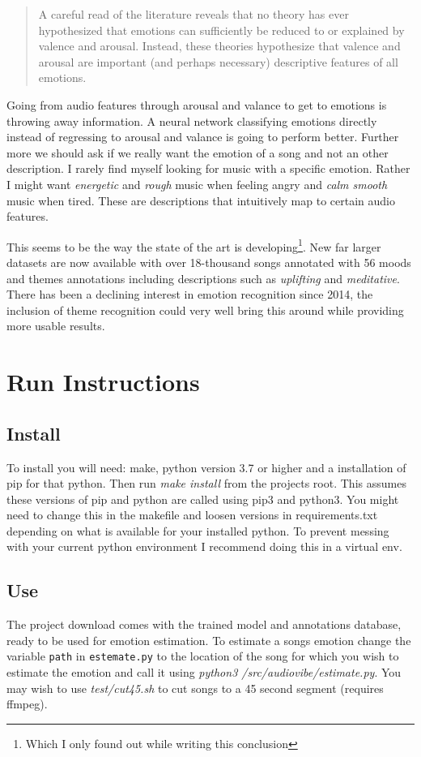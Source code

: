 \documentclass[lang=en, hanging-titles=true]{skrapport}
\begin{document}
\blockquote{
A careful read of the literature reveals that no theory has ever hypothesized that emotions can sufficiently be reduced to or explained by valence and arousal. Instead, these theories hypothesize that valence and arousal are important (and perhaps necessary) descriptive features of all emotions.
}

Going from audio features through arousal and valance to get to emotions is throwing away information. A neural network classifying emotions directly instead of regressing to arousal and valance is going to perform better. Further more we should ask if we really want the emotion of a song and not an other description. I rarely find myself looking for music with a specific emotion. Rather I might want \textit{energetic} and \textit{rough} music when feeling angry and \textit{calm smooth} music when tired. These are descriptions that intuitively map to certain audio features.

This seems to be the way the state of the art is developing\footnote{Which I only found out while writing this conclusion}. New far larger datasets are now available with over 18-thousand songs annotated with 56 moods and themes annotations including descriptions such as \textit{uplifting} and \textit{meditative}\cite{themes}. There has been a declining interest in emotion recognition since 2014, the inclusion of theme recognition could very well bring this around while providing more usable results.

\clearpage
\appendix
\section{Run Instructions}
\subsection*{Install}
To install you will need: make, python version 3.7 or higher and a installation of pip for that python. Then run \textit{make install} from the projects root. This assumes these versions of pip and python are called using pip3 and python3. You might need to change this in the makefile and loosen versions in requirements.txt depending on what is available for your installed python. To prevent messing with your current python environment I recommend doing this in a virtual env.

\subsection*{Use}
The project download comes with the trained model and annotations database, ready to be used for emotion estimation. To estimate a songs emotion change the variable \texttt{path} in \texttt{estemate.py} to the location of the song for which you wish to estimate the emotion and call it using \textit{python3 /src/audiovibe/estimate.py}. You may wish to use \textit{test/cut45.sh} to cut songs to a 45 second segment (requires ffmpeg).

\printbibliography
\end{document}
